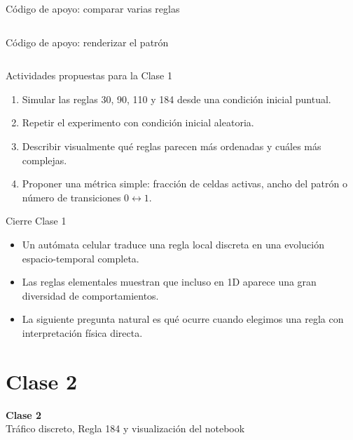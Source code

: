\begin{frame}[fragile]{Código de apoyo: comparar varias reglas}
\inputminted[firstline=1,lastline=21]{python}{codes/rule_gallery.py}
\end{frame}

\begin{frame}[fragile]{Código de apoyo: renderizar el patrón}
\inputminted[firstline=30,lastline=42]{python}{codes/elementary_ca.py}
\end{frame}

\begin{frame}{Actividades propuestas para la Clase 1}
\begin{enumerate}
    \item Simular las reglas 30, 90, 110 y 184 desde una condición inicial puntual.
    \item Repetir el experimento con condición inicial aleatoria.
    \item Describir visualmente qué reglas parecen más ordenadas y cuáles más complejas.
    \item Proponer una métrica simple: fracción de celdas activas, ancho del patrón o número de transiciones $0\leftrightarrow1$.
\end{enumerate}
\end{frame}

\begin{frame}{Cierre Clase 1}
\begin{itemize}
    \item Un autómata celular traduce una regla local discreta en una evolución espacio-temporal completa.
    \item Las reglas elementales muestran que incluso en 1D aparece una gran diversidad de comportamientos.
    \item La siguiente pregunta natural es qué ocurre cuando elegimos una regla con interpretación física directa.
\end{itemize}
\end{frame}

\section{Clase 2}

\begin{frame}[plain]
\centering
\vfill
{\Huge \bfseries Clase 2}\\[0.4cm]
{\Large Tráfico discreto, Regla 184 y visualización del notebook}
\vfill
\end{frame}

